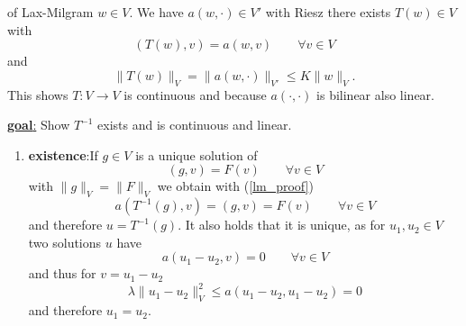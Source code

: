 \begin{proof_}
	of Lax-Milgram \enter
	$w \in V$. We have $a(w,\cdot) \in V'$ with Riesz there exists $T(w) \in V$ with 
	\begin{equation}\label{lm_proof}
		(T(w),v) = a(w,v) \qquad \forall v \in V
	\end{equation}
	and 
	\begin{equation*}
		\|T(w)\|_V = \|a(w,\cdot)\|_{V'} \leq K \|w\|_V.
	\end{equation*}
	This shows $T: V \to V$ is continuous and because $a(\cdot,\cdot)$ is bilinear also linear.
\end{proof_}

\par
\underline{\textbf{goal}:}
Show $T^{-1}$ exists and is continuous and linear.\enter

\begin{enumerate}[=label=(\alph*)]
	\item \textbf{existence}:\enter If $g \in V$ is a unique solution of 
	\begin{equation*}
	(g,v) = F(v) \qquad \forall v \in V
	\end{equation*}
	with $\|g\|_V = \|F\|_V$ we obtain with (\ref{lm_proof}) 
	\begin{equation*}
	a(T^{-1}(g),v) = (g,v) = F(v) \qquad \forall v \in V
	\end{equation*}
	and therefore $u = T^{-1}(g)$. It also holds that it is unique, as for $u_1, u_2 \in V$ two solutions $u$ have 
	\begin{equation*}
	a(u_1 - u_2,v) = 0 \qquad \forall v \in V
	\end{equation*}
	and thus for $v = u_1 - u_2$
	\begin{equation*}
	\lambda \|u_1 - u_2\|^2_V \leq a(u_1 -u_2, u_1 -u_2) = 0
	\end{equation*}
	and therefore $u_1 = u_2$.
	

\end{enumerate}
